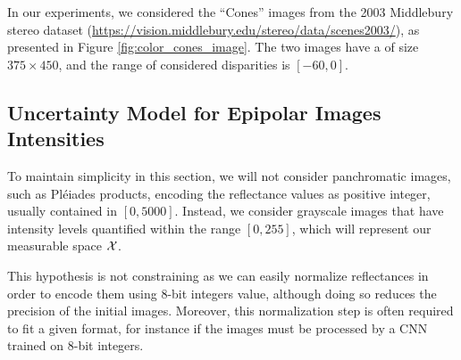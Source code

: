 In our experiments, we considered the ``Cones'' images from the 2003 Middlebury stereo dataset (\url{https://vision.middlebury.edu/stereo/data/scenes2003/}), as presented in Figure \ref{fig:color_cones_image}. The two images have a of size $375 \times 450$, and the range of considered disparities is $[-60, 0]$.

\subsection{Uncertainty Model for Epipolar Images Intensities}
To maintain simplicity in this section, we will not consider panchromatic images, such as Pléiades products, encoding the reflectance values as positive integer, usually contained in $[0, 5000]$. Instead, we consider grayscale images that have intensity levels quantified within the range $[0, 255]$, which will represent our measurable space ${\mathcal{X}}$.

\begin{remark}
    This hypothesis is not constraining as we can easily normalize reflectances in order to encode them using 8-bit integers value, although doing so reduces the precision of the initial images. Moreover, this normalization step is often required to fit a given format, for instance if the images must be processed by a CNN trained on 8-bit integers.
\end{remark}

